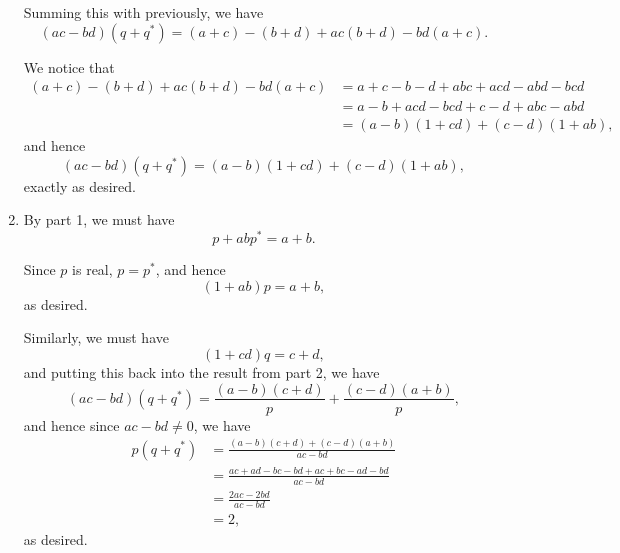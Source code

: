 \begin{enumerate}
          Summing this with previously, we have
          \[
              (ac - bd)(q + q^*) = (a + c) - (b + d) + ac(b + d) - bd(a + c).
          \]

          We notice that
          \begin{align*}
              (a + c) - (b + d) + ac(b + d) - bd(a + c) & = a + c - b - d + abc + acd - abd - bcd \\
                                                        & = a - b + acd - bcd + c - d + abc - abd \\
                                                        & = (a - b)(1 + cd) + (c - d)(1 + ab),
          \end{align*}
          and hence
          \[
              (ac - bd)(q + q^*) = (a - b)(1 + cd) + (c - d)(1 + ab),
          \]
          exactly as desired.

    \item By part 1, we must have
          \[
              p + abp^* = a + b.
          \]

          Since \(p\) is real, \(p = p^*\), and hence
          \[
              (1 + ab)p = a + b,
          \]
          as desired.

          Similarly, we must have
          \[
              (1 + cd)q = c + d,
          \]
          and putting this back into the result from part 2, we have
          \[
              (ac - bd)(q + q^*) = \frac{(a - b)(c + d)}{p} + \frac{(c - d)(a + b)}{p},
          \]
          and hence since \(ac - bd \neq 0\), we have
          \begin{align*}
              p(q + q^*) & = \frac{(a - b)(c + d) + (c - d)(a + b)}{ac - bd}       \\
                         & = \frac{ac + ad - bc - bd + ac + bc - ad - bd}{ac - bd} \\
                         & = \frac{2ac - 2bd}{ac - bd}                             \\
                         & = 2,
          \end{align*}
          as desired.
\end{enumerate}